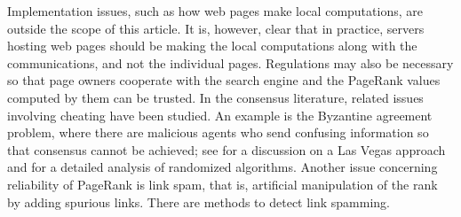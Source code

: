 \documentclass[11pt,draftcls,onecolumn]{IEEEtran}
\begin{document}
Implementation issues, such as how web pages 
make local computations, are outside the scope of this article. 
It is, however, clear that in practice, servers hosting web pages should be making the
local computations along with the communications, and not the individual pages.
Regulations may also be necessary so that page owners cooperate with the 
search engine and the PageRank values computed by them 
can be trusted. In the consensus literature, related issues 
involving cheating have been studied. 
An example is the Byzantine agreement problem,
where there are malicious agents who send
confusing information so that 
consensus cannot be achieved; see \cite{TemIsh:07} for a discussion
on a Las Vegas approach and \cite{TemCalDab_book} 
for a detailed analysis of randomized algorithms.
Another issue concerning reliability of PageRank is link spam, that is,
artificial manipulation of the rank by adding spurious links.  
There are methods \cite{LanMey:06,AndBorHop:07}
to detect link spamming.

\vspace{.5cm}
\end{document}
